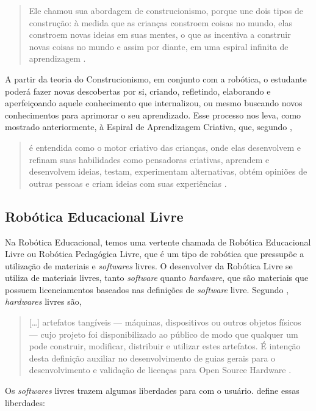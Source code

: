 \documentclass{textolivre}
\begin{document}
\begin{quote}
Ele chamou sua abordagem de construcionismo, porque une dois tipos de construção: à medida que as crianças constroem coisas no mundo, elas constroem novas ideias em suas mentes, o que as incentiva a construir novas coisas no mundo e assim por diante, em uma espiral infinita de aprendizagem \cite[p. 68]{resnick2020}.
\end{quote}

A partir da teoria do Construcionismo, em conjunto com a robótica, o estudante poderá fazer novas descobertas por si, criando, refletindo, elaborando e aperfeiçoando aquele conhecimento que internalizou, ou mesmo buscando novos conhecimentos para aprimorar o seu aprendizado. Esse processo nos leva, como mostrado anteriormente, à Espiral de Aprendizagem Criativa, que, segundo \textcite{resnick2020}, 

\begin{quote}
é entendida como o motor criativo das crianças, onde elas desenvolvem e refinam suas habilidades como pensadoras criativas, aprendem e desenvolvem ideias, testam, experimentam alternativas, obtém opiniões de outras pessoas e criam ideias com suas experiências \cite[p. 41]{resnick2020}.
\end{quote}

\subsection{Robótica Educacional Livre}
Na Robótica Educacional, temos uma vertente chamada de Robótica Educacional Livre ou Robótica Pedagógica Livre, que é um tipo de robótica que pressupõe a utilização de materiais e \emph{softwares} livres. O desenvolver da Robótica Livre se utiliza de materiais livres, tanto \emph{software} quanto \emph{hardware}, que são materiais que possuem licenciamentos baseados nas definições de \emph{software} livre. Segundo \textcite{association}, \emph{hardwares} livres são,

\begin{quote}
[…] artefatos tangíveis — máquinas, dispositivos ou outros objetos físicos — cujo projeto foi disponibilizado ao público de modo que qualquer um pode construir, modificar, distribuir e utilizar estes artefatos. É intenção desta definição auxiliar no desenvolvimento de guias gerais para o desenvolvimento e validação de licenças para Open Source Hardware \cite{association}.
\end{quote}

Os \emph{softwares} livres trazem algumas liberdades para com o usuário. \textcite{stallman2002} define essas liberdades:
\end{document}
